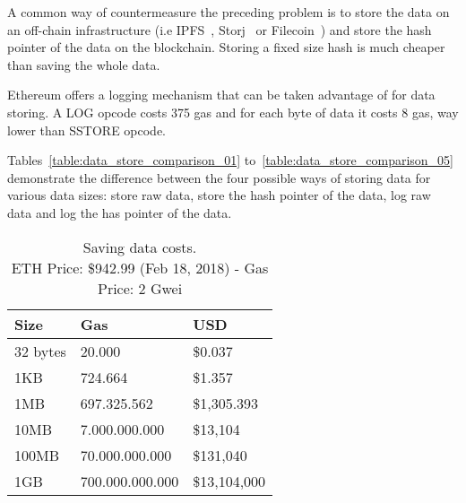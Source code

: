 A common way of countermeasure the preceding problem is to store the data on an off-chain infrastructure (i.e IPFS~\cite{ipfs}, Storj~\cite{storj} or Filecoin~\cite{filecoin}) and store the hash pointer of the data on the blockchain. Storing a fixed size hash is much cheaper than saving the whole data.

Ethereum offers a logging mechanism that can be taken advantage of for data storing. A LOG opcode costs 375 gas and for each byte of data it costs 8 gas, way lower than SSTORE opcode.

Tables~\ref{table:data_store_comparison_01} to~\ref{table:data_store_comparison_05} demonstrate the difference between the four possible ways of storing data for various data sizes: store raw data, store the hash pointer of the data, log raw data and log the has pointer of the data.

\begin{table}[!htb]
\centering
\begin{tabular}{|l|l|l|}
\hline
 Size & Gas  & USD \\ \hline
 32 bytes & 20.000  & \$0.037 \\ \hline
 1KB & 724.664  & \$1.357 \\ \hline
 1MB & 697.325.562  & \$1,305.393 \\ \hline
 10MB & 7.000.000.000  & \$13,104 \\ \hline
 100MB & 70.000.000.000  & \$131,040 \\ \hline
 1GB & 700.000.000.000  & \$13,104,000 \\ \hline
\end{tabular}
\captionsetup{format=hang, justification=centering}
\caption{Saving data costs.\\ ETH Price: \$942.99 (Feb 18, 2018) - Gas Price: 2 Gwei}
\label{table:bytes_usd_cost}
\end{table}

\begin{figure}
  \centering
  \caption{}
  \label{}
\end{figure}

